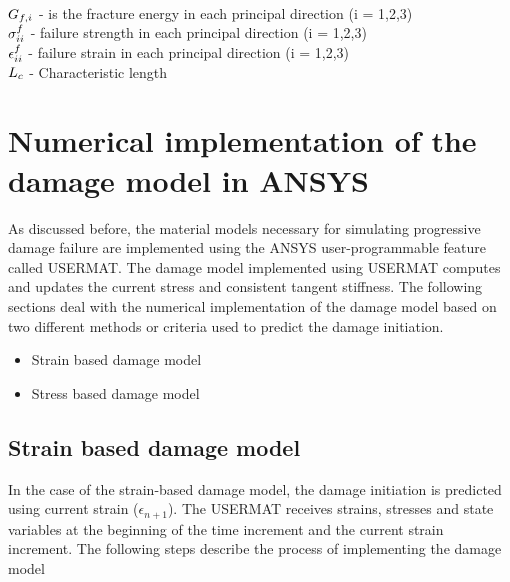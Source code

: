 \documentclass[12pt,twoside]{report}
\begin{document}
\\ 
\\ 
\\
$\mathlarger{G_{f,i}}$ \; - \;is the fracture energy in each principal direction (i = 1,2,3)  \\ $\mathlarger{\sigma_{ii}^{f}}$ \;\;\; -  \;  failure strength in each principal direction (i = 1,2,3) \\ $\mathlarger{\epsilon_{ii}^{f}}$\;\;\;\;\; - \; failure strain in each principal direction (i = 1,2,3) \\ $\mathlarger{L_{c}}$\;\;\;\;\; - \; Characteristic length

\section{Numerical implementation of the damage model in ANSYS}
\indent\indent\indent  As discussed before, the material models necessary for simulating progressive damage failure are implemented using the ANSYS user-programmable feature called USERMAT. The damage model implemented using USERMAT computes and updates the current stress and consistent tangent stiffness. The following sections deal with the numerical implementation of the damage model based on two different methods or criteria used to predict the damage initiation.
\\
\begin{itemize}
\item Strain based damage model 
\item Stress based damage model 
\end{itemize}
\subsection{Strain based damage model}
\indent\indent\indent  In the case of the strain-based damage model, the damage initiation is predicted using current strain ($\epsilon_{n+1}$).   The USERMAT receives strains, stresses and state variables at the beginning of the time increment and the current strain increment. The following steps describe the process of implementing the damage model
\end{document}
